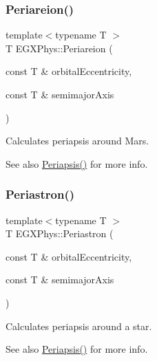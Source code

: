 \mbox{\label{group___astrophysics_ga0617ba07a30b0fd0544c02f691bfae26}} 
\subsubsection{\texorpdfstring{Periareion()}{Periareion()}}
{\footnotesize\ttfamily template$<$typename T $>$ \\
T E\+G\+X\+Phys\+::\+Periareion (\begin{DoxyParamCaption}\item[{const T \&}]{orbital\+Eccentricity,  }\item[{const T \&}]{semimajor\+Axis }\end{DoxyParamCaption})}



Calculates periapsis around Mars. 

\begin{DoxySeeAlso}{See also}
\hyperlink{group___astrophysics_ga4414ac75539371ec874a3d25cad6c9fe}{Periapsis()} for more info. 
\end{DoxySeeAlso}
\mbox{\label{group___astrophysics_ga477de6824cbb5986cdae923141e21648}} 
\subsubsection{\texorpdfstring{Periastron()}{Periastron()}}
{\footnotesize\ttfamily template$<$typename T $>$ \\
T E\+G\+X\+Phys\+::\+Periastron (\begin{DoxyParamCaption}\item[{const T \&}]{orbital\+Eccentricity,  }\item[{const T \&}]{semimajor\+Axis }\end{DoxyParamCaption})}



Calculates periapsis around a star. 

\begin{DoxySeeAlso}{See also}
\hyperlink{group___astrophysics_ga4414ac75539371ec874a3d25cad6c9fe}{Periapsis()} for more info. 
\end{DoxySeeAlso}
\mbox{\label{group___astrophysics_gada5892309279a3a687c4eb2f88238e4e}} 
